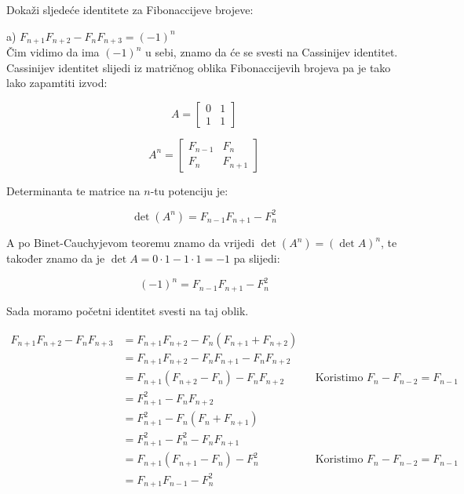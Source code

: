 \documentclass{article}
\begin{document}
	Dokaži sljedeće identitete za Fibonaccijeve brojeve:
	
	a) \( F_{n + 1} F_{n + 2} - F_n F_{n + 3} = (-1)^n \)\\
	
	Čim vidimo da ima \( (-1)^n \) u sebi, znamo da će se svesti na Cassinijev identitet. Cassinijev identitet slijedi iz matričnog oblika Fibonaccijevih brojeva pa je tako lako zapamtiti izvod:
	
	$$ A =  \begin{bmatrix}
		0 & 1 \\
		1 & 1 
	\end{bmatrix}  $$
	
	$$ A^n =  \begin{bmatrix}
		F_{n - 1} & F_n \\
		F_n & F_{n + 1}
	\end{bmatrix} $$
	
	Determinanta te matrice na \(n\)-tu potenciju je:
	
	\[ \det (A^n) = F_{n - 1} F_{n + 1} - F^2_n \]
	
	A po Binet-Cauchyjevom teoremu znamo da vrijedi \( \det (A^n) = (\det A)^n \), te također znamo da je \( \det A = 0 \cdot 1 - 1 \cdot 1 = -1 \) pa slijedi:
	
	\[ (-1)^n = F_{n - 1} F_{n + 1} - F^2_n \]
	
	Sada moramo početni identitet svesti na taj oblik. 
	
	\begin{align*}
		F_{n + 1} F_{n + 2} - F_n F_{n + 3} &= F_{n + 1} F_{n + 2} - F_n (F_{n + 1} + F_{n + 2}) \\
		&= F_{n + 1} F_{n + 2} - F_n F_{n + 1} - F_n F_{n + 2} \\
		&= F_{n + 1} (F_{n + 2} - F_n) - F_n F_{n + 2} && \text{Koristimo } F_n - F_{n - 2} = F_{n - 1}\\
		&= F^2_{n + 1} - F_n F_{n + 2} \\
		&= F^2_{n + 1} - F_n (F_n + F_{n + 1}) \\
		&= F^2_{n + 1} - F^2_n - F_n F_{n + 1} \\
		&= F_{n + 1} (F_{n + 1} - F_n) - F_n^2 && \text{Koristimo } F_n - F_{n - 2} = F_{n - 1}\\
		&= F_{n + 1} F_{n - 1} - F_n^2
	\end{align*}
\end{document}
